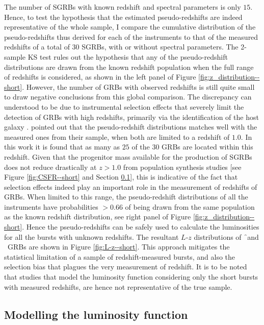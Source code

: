 The number of SGRBs with known redshift and spectral parameters is only $15$. Hence, to test the hypothesis that the estimated pseudo-redshifts are indeed representative of the whole sample, I compare the cumulative distribution of the pseudo-redshifts thus derived for each of the instruments to that of the measured redshifts of a total of $30$ SGRBs, with or without spectral parameters. The 2-sample KS test rules out the hypothesis that any of the pseudo-redshift distributions are drawn from the known redshift population when the full range of redshifts is considered, as shown in the left panel of Figure \ref{fig:z_distribution--short}. However, the number of GRBs with observed redshifts is still quite small to draw negative conclusions from this global comparison. The discrepancy can understood to be due to instrumental selection effects that severely limit the detection of GRBs with high redshifts, primarily via the identification of the host galaxy \citep{Berger-2014-sGRB_review}.  pointed out that the pseudo-redshift distributions matches well with the measured ones from their sample, when both are limited to a redshift of $1.0$. In this work it is found that as many as $25$ of the $30$ GRBs are located within this redshift. Given that the progenitor mass available for the production of SGRBs does not reduce drastically at $z > 1.0$ from population synthesis studies [see Figure \ref{fig:CSFR--short} and Section \ref{subsec:modelling_LF--short}], this is indicative of the fact that selection effects indeed play an important role in the measurement of redshifts of GRBs. When limited to this range, the pseudo-redshift distributions of all the instruments have probabilities $> 0.66$ of being drawn from the same population as the known redshift distribution, see right panel of Figure \ref{fig:z_distribution--short}. Hence the pseudo-redshifts can be safely used to calculate the luminosities for all the bursts with unknown redshifts. The resultant $L$-$z$ distributions of \f\ and \B\ GRBs are shown in Figure \ref{fig:L-z--short}. This approach mitigates the statistical limitation of a sample of redshift-measured bursts, and also the selection bias that plagues the very measurement of redshift. It is to be noted that studies that model the luminosity function considering only the short bursts with measured redshifts, are hence not representative of the true sample.


\subsection{Modelling the luminosity function}
\label{subsec:modelling_LF--short}

